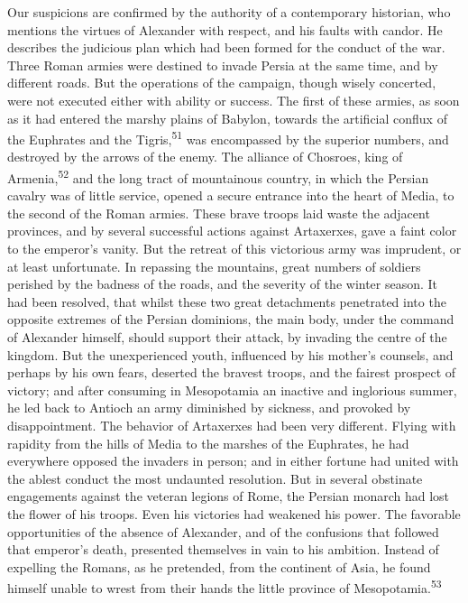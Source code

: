 
Our suspicions are confirmed by the authority of a contemporary
historian, who mentions the virtues of Alexander with respect,
and his faults with candor. He describes the judicious plan which
had been formed for the conduct of the war. Three Roman armies
were destined to invade Persia at the same time, and by different
roads. But the operations of the campaign, though wisely
concerted, were not executed either with ability or success. The
first of these armies, as soon as it had entered the marshy
plains of Babylon, towards the artificial conflux of the
Euphrates and the Tigris,\textsuperscript{51} was encompassed by the superior
numbers, and destroyed by the arrows of the enemy. The alliance
of Chosroes, king of Armenia,\textsuperscript{52} and the long tract of
mountainous country, in which the Persian cavalry was of little
service, opened a secure entrance into the heart of Media, to the
second of the Roman armies. These brave troops laid waste the
adjacent provinces, and by several successful actions against
Artaxerxes, gave a faint color to the emperor’s vanity. But the
retreat of this victorious army was imprudent, or at least
unfortunate. In repassing the mountains, great numbers of
soldiers perished by the badness of the roads, and the severity
of the winter season. It had been resolved, that whilst these two
great detachments penetrated into the opposite extremes of the
Persian dominions, the main body, under the command of Alexander
himself, should support their attack, by invading the centre of
the kingdom. But the unexperienced youth, influenced by his
mother’s counsels, and perhaps by his own fears, deserted the
bravest troops, and the fairest prospect of victory; and after
consuming in Mesopotamia an inactive and inglorious summer, he
led back to Antioch an army diminished by sickness, and provoked
by disappointment. The behavior of Artaxerxes had been very
different. Flying with rapidity from the hills of Media to the
marshes of the Euphrates, he had everywhere opposed the invaders
in person; and in either fortune had united with the ablest
conduct the most undaunted resolution. But in several obstinate
engagements against the veteran legions of Rome, the Persian
monarch had lost the flower of his troops. Even his victories had
weakened his power. The favorable opportunities of the absence of
Alexander, and of the confusions that followed that emperor’s
death, presented themselves in vain to his ambition. Instead of
expelling the Romans, as he pretended, from the continent of
Asia, he found himself unable to wrest from their hands the
little province of Mesopotamia.\textsuperscript{53}

